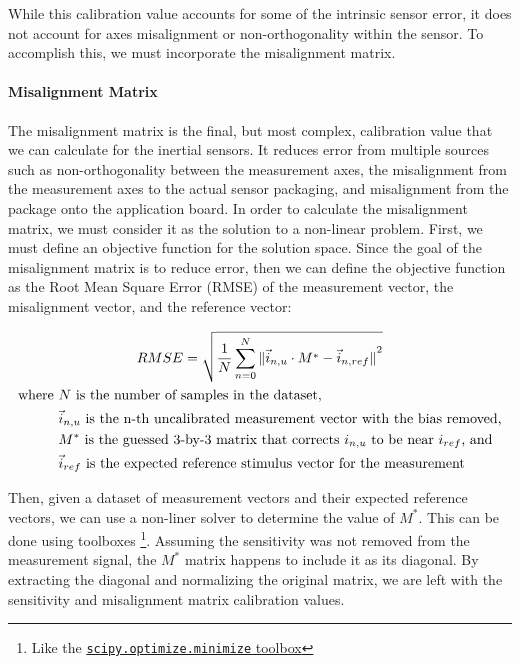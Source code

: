 While this calibration value accounts for some of the intrinsic sensor error, it does not account for axes misalignment or non-orthogonality within the sensor. To accomplish this, we must incorporate the misalignment matrix.

\paragraph*{Misalignment Matrix}

The misalignment matrix is the final, but most complex, calibration value that we can calculate for the inertial sensors. It reduces error from multiple sources such as non-orthogonality between the measurement axes, the misalignment from the measurement axes to the actual sensor packaging, and misalignment from the package onto the application board. In order to calculate the misalignment matrix, we must consider it as the solution to a non-linear problem. First, we must define an objective function for the solution space. Since the goal of the misalignment matrix is to reduce error, then we can define the objective function as the Root Mean Square Error (RMSE) of the measurement vector, the misalignment vector, and the reference vector:

\begin{gather}
    RMSE = \sqrt{\frac{1}{N}\sum_{n=0}^N{\|{\vec{i}_{n,u} \cdot M^* -\vec{i}_{n,ref}\|}^2}} \\
    \begin{aligned}
        \text{where } & N \text{ is the number of samples in the dataset,} \\
        & \vec{i}_{n,u} \text{ is the n-th uncalibrated measurement vector with the bias removed,} \\
        & M^* \text{ is the guessed 3-by-3 matrix that corrects $i_{n,u}$ to be near $i_{ref}$, and } \\
        & \vec{i}_{ref} \text{ is the expected reference stimulus vector for the measurement}
    \end{aligned} \notag
\end{gather}

Then, given a dataset of measurement vectors and their expected reference vectors, we can use a non-liner solver to determine the value of $M^*$. This can be done using toolboxes \footnote[4]{Like the \href{https://docs.scipy.org/doc/scipy/reference/generated/scipy.optimize.minimize.html}{\lstinline{scipy.optimize.minimize} toolbox}}. 
Assuming the sensitivity was not removed from the measurement signal, the $M^*$ matrix happens to include it as its diagonal. 
By extracting the diagonal and normalizing the original matrix, we are left with the sensitivity and misalignment matrix calibration values.

